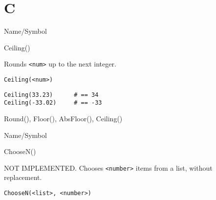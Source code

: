 \rl


\section{C}
\rl


\begin{desc}{Name/Symbol}
\item[Name/Symbol]  	Ceiling()

\item[Description] 	Rounds \verb+<num>+ up to the next integer.

\item[Usage]
\begin{verbatim}
Ceiling(<num>)
\end{verbatim}

\item[Example] 
\begin{verbatim}
Ceiling(33.23)  	# == 34
Ceiling(-33.02) 	# == -33
\end{verbatim}

\item[See Also]     	Round(), Floor(), AbsFloor(), Ceiling()
\end{desc}

\rl


\begin{desc}{Name/Symbol}
\item[Name/Symbol]  	ChooseN()

\item[Description] 	NOT IMPLEMENTED.  Chooses \verb+<number>+ items from a list, without replacement.

\item[Usage] 
\begin{verbatim}
ChooseN(<list>, <number>)
\end{verbatim}

\item[Example]	

\item[See Also]	
\end{desc}

\rl


